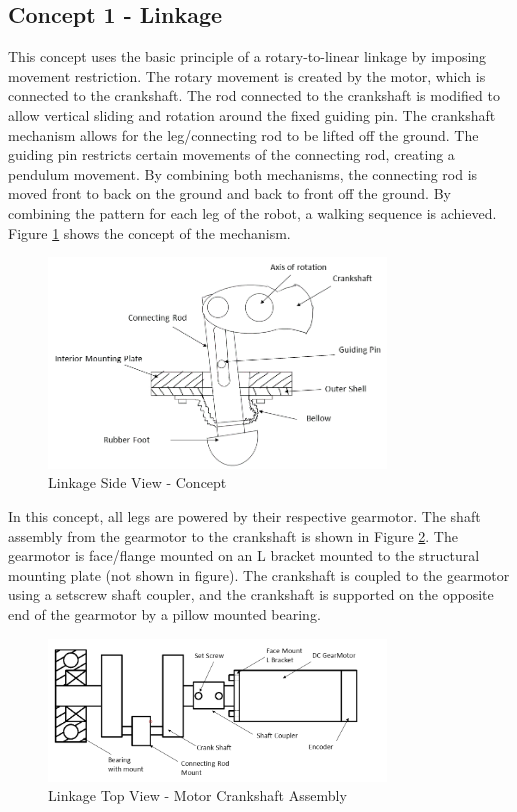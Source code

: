 \subsection{Concept 1 - Linkage}

This concept uses the basic principle of a rotary-to-linear linkage by imposing movement restriction. The rotary movement is created by the motor, which is connected to the crankshaft. The rod connected to the crankshaft is modified to allow vertical sliding and rotation around the fixed guiding pin. The crankshaft mechanism allows for the leg/connecting rod to be lifted off the ground. The guiding pin restricts certain movements of the connecting rod, creating a pendulum movement. By combining both mechanisms, the connecting rod is moved front to back on the ground and back to front off the ground. By combining the pattern for each leg of the robot, a walking sequence is achieved. Figure \ref{fig:concept1_linkage} shows the concept of the mechanism.

\begin{figure}[H]
    \centering
    \includegraphics[width=0.8\textwidth]{img/C1/Concept.PNG}
    \caption{Linkage Side View - Concept}
    \label{fig:concept1_linkage}
\end{figure}

In this concept, all legs are powered by their respective gearmotor. The shaft assembly from the gearmotor to the crankshaft is shown in Figure \ref{fig:concept1_Crankshaft}. The gearmotor is face/flange mounted on an L bracket mounted to the structural mounting plate (not shown in figure). The crankshaft is coupled to the gearmotor using a setscrew shaft coupler, and the crankshaft is supported on the opposite end of the gearmotor by a pillow mounted bearing.

\begin{figure}[H]
    \centering
    \includegraphics[width=0.8\textwidth]{img/C1/Crankshaft.PNG}
    \caption{Linkage Top View - Motor Crankshaft Assembly}
    \label{fig:concept1_Crankshaft}
\end{figure}

